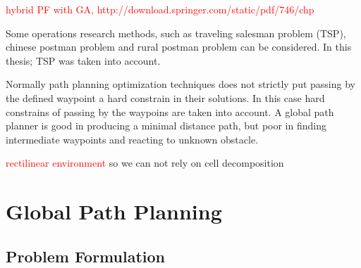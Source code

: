 \textcolor{red} { hybrid PF with GA, 
http://download.springer.com/static/pdf/746/chp%
}

Some operations research methods, such as traveling salesman problem (TSP), chinese postman problem and rural postman problem can be considered. In this thesis; TSP was taken into account. 


Normally path planning optimization techniques does not strictly put passing by the defined waypoint a hard constrain in their solutions. In this case hard constrains of passing by the waypoins are taken into account. A global path planner is good in producing a minimal distance path, but poor in finding intermediate waypoints and reacting to unknown obstacle.

\textcolor{red}{rectilinear environment}
so we can not rely on cell decomposition %

\section{Global Path Planning } \label{global_path_planning}

\subsection{Problem Formulation}




